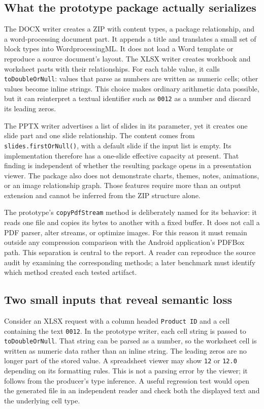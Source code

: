 \documentclass[10pt,letterpaper]{article}
\begin{document}
\subsection{What the prototype package actually serializes}

The DOCX writer creates a ZIP with content types, a package relationship, and a word-processing document part. It appends a title and translates a small set of block types into WordprocessingML. It does not load a Word template or reproduce a source document's layout. The XLSX writer creates workbook and worksheet parts with their relationships. For each table value, it calls \texttt{toDoubleOrNull}: values that parse as numbers are written as numeric cells; other values become inline strings. This choice makes ordinary arithmetic data possible, but it can reinterpret a textual identifier such as \texttt{0012} as a number and discard its leading zeros.

The PPTX writer advertises a list of slides in its parameter, yet it creates one slide part and one slide relationship. The content comes from \texttt{slides.firstOrNull()}, with a default slide if the input list is empty. Its implementation therefore has a one-slide effective capacity at present. That finding is independent of whether the resulting package opens in a presentation viewer. The package also does not demonstrate charts, themes, notes, animations, or an image relationship graph. Those features require more than an output extension and cannot be inferred from the ZIP structure alone.

The prototype's \texttt{copyPdfStream} method is deliberately named for its behavior: it reads one file and copies its bytes to another with a fixed buffer. It does not call a PDF parser, alter streams, or optimize images. For this reason it must remain outside any compression comparison with the Android application's PDFBox path. This separation is central to the report. A reader can reproduce the source audit by examining the corresponding methods; a later benchmark must identify which method created each tested artifact.

\subsection{Two small inputs that reveal semantic loss}

Consider an XLSX request with a column headed \texttt{Product ID} and a cell containing the text \texttt{0012}. In the prototype writer, each cell string is passed to \texttt{toDoubleOrNull}. That string can be parsed as a number, so the worksheet cell is written as numeric data rather than an inline string. The leading zeros are no longer part of the stored value. A spreadsheet viewer may show \texttt{12} or \texttt{12.0} depending on its formatting rules. This is not a parsing error by the viewer; it follows from the producer's type inference. A useful regression test would open the generated file in an independent reader and check both the displayed text and the underlying cell type.
\end{document}
